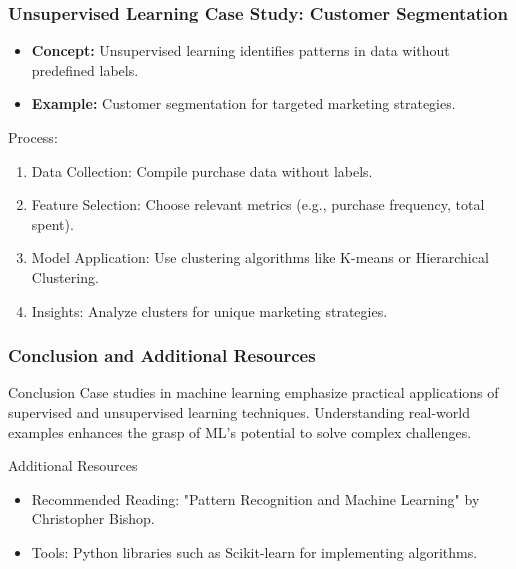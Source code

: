 \documentclass[aspectratio=169]{beamer}
\begin{document}
\begin{frame}[fragile]
    \frametitle{Unsupervised Learning Case Study: Customer Segmentation}
    \begin{itemize}
        \item \textbf{Concept:} 
            Unsupervised learning identifies patterns in data without predefined labels.
        \item \textbf{Example:} 
            Customer segmentation for targeted marketing strategies.
    \end{itemize}
    
    \begin{block}{Process:}
        \begin{enumerate}
            \item Data Collection: Compile purchase data without labels.
            \item Feature Selection: Choose relevant metrics (e.g., purchase frequency, total spent).
            \item Model Application: Use clustering algorithms like K-means or Hierarchical Clustering.
            \item Insights: Analyze clusters for unique marketing strategies.
        \end{enumerate}
    \end{block}
\end{frame}

\begin{frame}[fragile]
    \frametitle{Conclusion and Additional Resources}
    \begin{block}{Conclusion}
        Case studies in machine learning emphasize practical applications of supervised and unsupervised learning techniques. Understanding real-world examples enhances the grasp of ML's potential to solve complex challenges.
    \end{block}
    
    \begin{block}{Additional Resources}
        \begin{itemize}
            \item Recommended Reading: 
                "Pattern Recognition and Machine Learning" by Christopher Bishop.
            \item Tools: 
                Python libraries such as Scikit-learn for implementing algorithms.
        \end{itemize}
    \end{block}
\end{frame}
\end{document}

